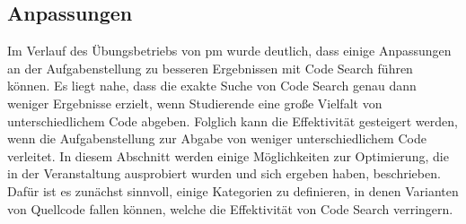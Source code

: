 \subsection{Anpassungen}\label{subsec:pm-adaptations}

Im Verlauf des Übungsbetriebs von \ac{pm} wurde deutlich, dass einige Anpassungen an der Aufgabenstellung zu besseren Ergebnissen mit Code Search führen können.
Es liegt nahe, dass die exakte Suche von Code Search genau dann weniger Ergebnisse erzielt, wenn Studierende eine große Vielfalt von unterschiedlichem Code abgeben.
Folglich kann die Effektivität gesteigert werden, wenn die Aufgabenstellung zur Abgabe von weniger unterschiedlichem Code verleitet.
In diesem Abschnitt werden einige Möglichkeiten zur Optimierung, die in der Veranstaltung ausprobiert wurden und sich ergeben haben, beschrieben.
Dafür ist es zunächst sinnvoll, einige Kategorien zu definieren, in denen Varianten von Quellcode fallen können, welche die Effektivität von Code Search verringern.

